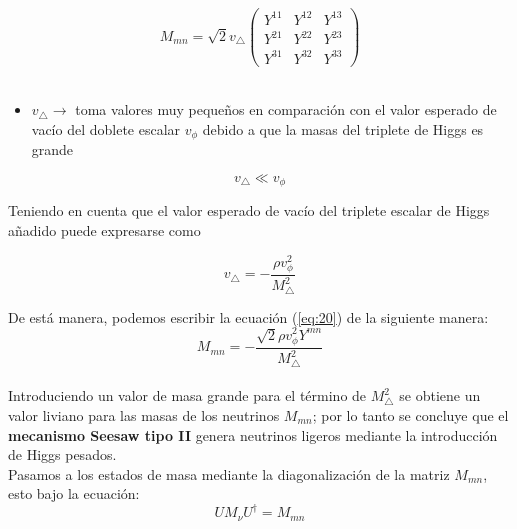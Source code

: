 \documentclass[12pt]{article}
\begin{document}
\begin{equation}
    M_{mn} = \sqrt{2}v_\triangle \begin{pmatrix}    Y^{11} &  Y^{12} & Y^{13} \\
         Y^{21} &  Y^{22} & Y^{23}  \\
         Y^{31} &  Y^{32} & Y^{33}  \end{pmatrix}
       \label{eq:20}  
\end{equation} \\

\begin{itemize}
    \item \(v_\triangle \rightarrow  \) toma valores muy pequeños
en comparación con el valor esperado de vacío del doblete escalar $v_\phi$ debido a que la masas del triplete de Higgs es grande
\end{itemize}
\[v_\triangle \ll v_\phi \]
  
Teniendo en cuenta que el valor esperado de vacío del triplete escalar de Higgs añadido puede expresarse como

\begin{equation}
    \label{eq:valoeradodevacío}
     v_\triangle = - \frac{\rho v^{2}_\phi}{M^{2}_\triangle}
\end{equation}

De está manera, podemos escribir la ecuación (\ref{eq:20}) de la siguiente manera: \\

\begin{equation}
    M_{mn}= -\frac{\sqrt{2}\rho v^{2}_\phi Y^{mn}}{M^{2}_\triangle} 
\end{equation} \\

Introduciendo un valor de masa grande para el término de \( M^{2}_\triangle \) se obtiene un valor liviano para las masas de los neutrinos \( M_{mn} \); por lo tanto se concluye que el \textbf{mecanismo Seesaw tipo II} genera neutrinos ligeros mediante la introducción de Higgs pesados. \\

Pasamos a los estados de masa mediante la diagonalización de la
matriz \( M_{mn} \), esto bajo la ecuación: 
\begin{equation}
   UM_\nu U^\dagger= M_{mn}
\label{eq:23}
\end{equation}
\end{document}
